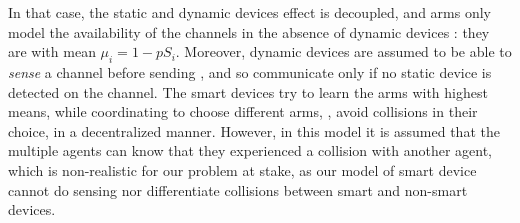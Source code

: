 In that case, the static and dynamic devices effect is decoupled, and arms only model the availability of the channels in the absence of dynamic devices : they are \iid{} with mean $\mu_i = 1 - p S_i$.
Moreover, dynamic devices are assumed to be able to \emph{sense} a channel before sending \cite{Zhao10}, and so communicate only if no static device is detected on the channel.
The smart devices try to learn the arms with highest means, while coordinating to choose different arms, \ie, avoid collisions in their choice, in a decentralized manner.
However, in this model it is assumed that the multiple agents can know that they experienced a collision with another agent, which is non-realistic for our problem at stake, as our model of smart device cannot do sensing nor differentiate collisions between smart and non-smart devices.



